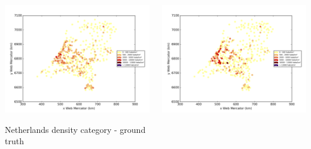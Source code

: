 \documentclass[c]{beamer}
\begin{document}
\begin{frame}
\begin{columns}
 \begin{column}{0.5\textwidth}
  \begin{overlayarea}{\linewidth}{4cm}
    \centering\vfill
    \includegraphics[scale=0.25]{../../data/Pays-Bas/test/Neural_Network_Classification-oversampling/Neural_Network_Classification-oversampling/density_ground_truth.png}
  \end{overlayarea}
  \begin{overlayarea}{\linewidth}{0.5cm}
    \centering
    \tiny Netherlands density category - ground truth\par
  \end{overlayarea}
 \end{column}
 \begin{column}{0.5\textwidth}
  \begin{overlayarea}{\linewidth}{4cm}
    \centering\vfill
    \includegraphics[scale=0.25]{../../data/Pays-Bas/test/Neural_Network_Classification-oversampling/Neural_Network_Classification-oversampling/density_classification.png}

\end{overlayarea}
\end{column}
\end{columns}
\end{frame}
\end{document}
